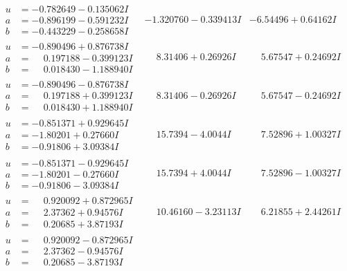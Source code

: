 \documentclass[1p]{elsarticle_modified}
\theoremstyle{definition}
\begin{document}
$$\begin{array}{c|c|c}
\begin{aligned}
u &= -0.782649 - 0.135062 I \\
a &= -0.896199 - 0.591232 I \\
b &= -0.443229 - 0.258658 I\end{aligned}
 & -1.320760 - 0.339413 I & -6.54496 + 0.64162 I \\ \hline\begin{aligned}
u &= -0.890496 + 0.876738 I \\
a &= \phantom{-}0.197188 - 0.399123 I \\
b &= \phantom{-}0.018430 - 1.188940 I\end{aligned}
 & \phantom{-}8.31406 + 0.26926 I & \phantom{-}5.67547 + 0.24692 I \\ \hline\begin{aligned}
u &= -0.890496 - 0.876738 I \\
a &= \phantom{-}0.197188 + 0.399123 I \\
b &= \phantom{-}0.018430 + 1.188940 I\end{aligned}
 & \phantom{-}8.31406 - 0.26926 I & \phantom{-}5.67547 - 0.24692 I \\ \hline\begin{aligned}
u &= -0.851371 + 0.929645 I \\
a &= -1.80201 + 0.27660 I \\
b &= -0.91806 + 3.09384 I\end{aligned}
 & \phantom{-}15.7394 - 4.0044 I & \phantom{-}7.52896 + 1.00327 I \\ \hline\begin{aligned}
u &= -0.851371 - 0.929645 I \\
a &= -1.80201 - 0.27660 I \\
b &= -0.91806 - 3.09384 I\end{aligned}
 & \phantom{-}15.7394 + 4.0044 I & \phantom{-}7.52896 - 1.00327 I \\ \hline\begin{aligned}
u &= \phantom{-}0.920092 + 0.872965 I \\
a &= \phantom{-}2.37362 + 0.94576 I \\
b &= \phantom{-}0.20685 + 3.87193 I\end{aligned}
 & \phantom{-}10.46160 - 3.23113 I & \phantom{-}6.21855 + 2.44261 I \\ \hline\begin{aligned}
u &= \phantom{-}0.920092 - 0.872965 I \\
a &= \phantom{-}2.37362 - 0.94576 I \\
b &= \phantom{-}0.20685 - 3.87193 I\end{aligned}

\end{array}$$
\end{document}
